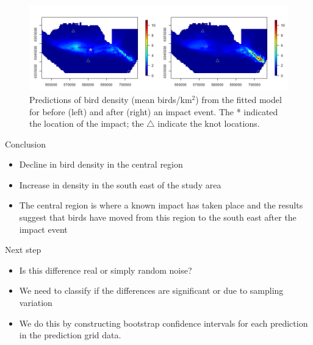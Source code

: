 \begin{figure}[h]
  \centering
  \includegraphics[width=12cm]{pointEstimate.png}
  \caption{Predictions of bird density (mean birds/km$^2$) from the fitted model for before (left) and after (right) an impact event. The * indicated the location of the impact; the $\triangle$ indicate the knot locations. }
  \label{fig:pointest}
\end{figure}

\begin{block}{Conclusion}
\begin{itemize}
  \item Decline in bird density in the central region
  \item Increase in density in the south east of the study area 
  \item The central region is where a known impact has taken place and the results suggest that birds have moved from this region to the south east after the impact event
\end{itemize}
\end{block}

\begin{block}{Next step}
\begin{itemize}
  \item Is this difference real or simply random noise?
  \item We need to classify if the differences are significant or due to sampling variation
  \item We do this by constructing bootstrap confidence intervals for each prediction in the prediction grid data.
\end{itemize}
\end{block}


